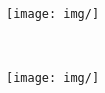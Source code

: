 \begin{figure}[]
\centering
\begin{subfigure}[t]{0.49\textwidth}
\texttt{[image: img/]}
\caption{}
\end{subfigure}
~
\begin{subfigure}[t]{0.49\textwidth}
\texttt{[image: img/]}
\caption{}
\end{subfigure}
\caption{}
\label{fig:}
\end{figure}
